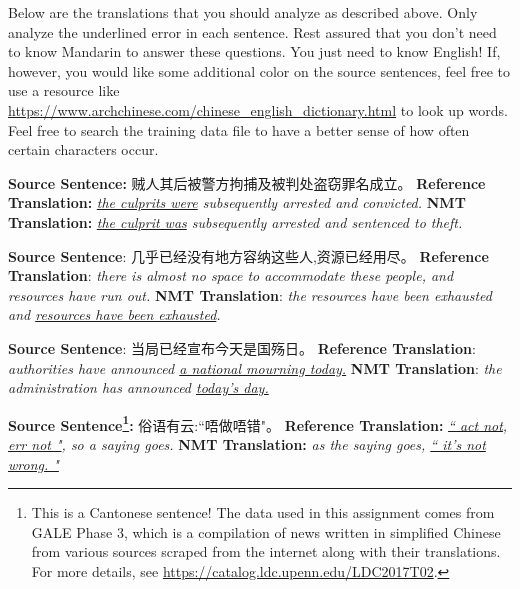 \begin{parts}
    Below are the translations that you should analyze as described above. Only analyze the underlined error in each sentence. Rest assured that you don't need to know Mandarin to answer these questions. You just need to know English! If, however, you would like some additional color on the source sentences, feel free to use a resource like \url{https://www.archchinese.com/chinese_english_dictionary.html} to look up words. Feel free to search the training data file to have a better sense of how often certain characters occur.

    \begin{subparts}
        \subpart[2]
        \textbf{Source Sentence:} 贼人其后被警方拘捕及被判处盗窃罪名成立。 \newline
        \textbf{Reference Translation:} \textit{\underline{the culprits were} subsequently arrested and convicted.}\newline
        \textbf{NMT Translation:} \textit{\underline{the culprit was} subsequently arrested and sentenced to theft.}
        
        

        \subpart[2]
        \textbf{Source Sentence}: 几乎已经没有地方容纳这些人,资源已经用尽。\newline
        \textbf{Reference Translation}: \textit{there is almost no space to accommodate these people, and resources have run out.   }\newline
        \textbf{NMT Translation}: \textit{the resources have been exhausted and \underline{resources have been exhausted}.}
        
        

        \subpart[2]
        \textbf{Source Sentence}: 当局已经宣布今天是国殇日。 \newline
        \textbf{Reference Translation}: \textit{authorities have announced \underline{a national mourning today.}}\newline
        \textbf{NMT Translation}: \textit{the administration has announced \underline{today's day.}}
        
        
        
        \subpart[2] 
        \textbf{Source Sentence\footnote{This is a Cantonese sentence! The data used in this assignment comes from GALE Phase 3, which is a compilation of news written in simplified Chinese from various sources scraped from the internet along with their translations. For more details, see \url{https://catalog.ldc.upenn.edu/LDC2017T02}. }:} 俗语有云:``唔做唔错"。\newline
        \textbf{Reference Translation:} \textit{\underline{`` act not, err not "}, so a saying goes.}\newline
        \textbf{NMT Translation:} \textit{as the saying goes, \underline{`` it's not wrong. "}}
        

\end{subparts}
\end{parts}
